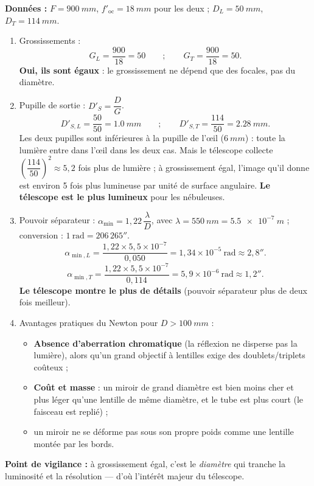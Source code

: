 \documentclass[11pt]{article}
\begin{document}
\begin{corrige}
\textbf{Données :} $F = \SI{900}{mm}$, $f'_{\text{oc}} = \SI{18}{mm}$ pour les deux ; $D_L = \SI{50}{mm}$, $D_T = \SI{114}{mm}$.
\begin{enumerate}
    \item Grossissements :
    \[ G_L = \frac{900}{18} = 50 \qquad ; \qquad G_T = \frac{900}{18} = 50. \]
    \textbf{Oui, ils sont égaux} : le grossissement ne dépend que des focales, pas du diamètre.
    \item Pupille de sortie : $D'_S = \dfrac{D}{G}$.
    \[ D'_{S,L} = \frac{50}{50} = \SI{1,0}{mm} \qquad ; \qquad D'_{S,T} = \frac{114}{50} = \SI{2,28}{mm}. \]
    Les deux pupilles sont inférieures à la pupille de l'œil ($\SI{6}{mm}$) : toute la lumière entre dans l'œil dans les deux cas. Mais le télescope collecte $\left(\dfrac{114}{50}\right)^2 \approx 5,2$ fois plus de lumière ; à grossissement égal, l'image qu'il donne est environ 5 fois plus lumineuse par unité de surface angulaire. \textbf{Le télescope est le plus lumineux} pour les nébuleuses.
    \item Pouvoir séparateur : $\alpha_{\min} = 1,22\,\dfrac{\lambda}{D}$, avec $\lambda = \SI{550}{nm} = \SI{5,5e-7}{m}$ ; conversion : $1\ \text{rad} = 206\,265''$.
    \[ \alpha_{\min,L} = \frac{1,22 \times 5,5\times10^{-7}}{0,050} = 1,34\times10^{-5}\ \text{rad} \approx 2,8''. \]
    \[ \alpha_{\min,T} = \frac{1,22 \times 5,5\times10^{-7}}{0,114} = 5,9\times10^{-6}\ \text{rad} \approx 1,2''. \]
    \textbf{Le télescope montre le plus de détails} (pouvoir séparateur plus de deux fois meilleur).
    \item Avantages pratiques du Newton pour $D > \SI{100}{mm}$ :
    \begin{itemize}
        \item \textbf{Absence d'aberration chromatique} (la réflexion ne disperse pas la lumière), alors qu'un grand objectif à lentilles exige des doublets/triplets coûteux ;
        \item \textbf{Coût et masse} : un miroir de grand diamètre est bien moins cher et plus léger qu'une lentille de même diamètre, et le tube est plus court (le faisceau est replié) ;
        \item un miroir ne se déforme pas sous son propre poids comme une lentille montée par les bords.
    \end{itemize}
\end{enumerate}
\textbf{Point de vigilance :} à grossissement égal, c'est le \emph{diamètre} qui tranche la luminosité et la résolution — d'où l'intérêt majeur du télescope.
\end{corrige}
\end{document}
